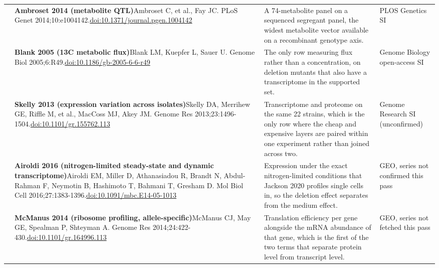 \begin{landscape}
\begin{longtable}{@{}r@{\hspace{4pt}} L{86mm} L{92mm} L{62mm}@{}}
 & \textbf{Ambroset 2014 (metabolite QTL)}\newline Ambroset C, et al., Fay JC. PLoS Genet 2014;10:e1004142.\newline \href{https://doi.org/10.1371/journal.pgen.1004142}{doi:10.1371/\allowbreak journal.pgen.1004142} & A 74-metabolite panel on a sequenced segregant panel, the widest metabolite vector available on a recombinant genotype axis. & PLOS Genetics SI \\
 & \textbf{Blank 2005 (13C metabolic flux)}\newline Blank LM, Kuepfer L, Sauer U. Genome Biol 2005;6:R49.\newline \href{https://doi.org/10.1186/gb-2005-6-6-r49}{doi:10.1186/\allowbreak gb-2005-6-6-r49} & The only row measuring flux rather than a concentration, on deletion mutants that also have a transcriptome in the supported set. & Genome Biology open-access SI \\
 & \textbf{Skelly 2013 (expression variation across isolates)}\newline Skelly DA, Merrihew GE, Riffle M, et al., MacCoss MJ, Akey JM. Genome Res 2013;23:1496-1504.\newline \href{https://doi.org/10.1101/gr.155762.113}{doi:10.1101/\allowbreak gr.155762.113} & Transcriptome and proteome on the same 22 strains, which is the only row where the cheap and expensive layers are paired within one experiment rather than joined across two. & Genome Research SI (unconfirmed) \\
 & \textbf{Airoldi 2016 (nitrogen-limited steady-state and dynamic transcriptome)}\newline Airoldi EM, Miller D, Athanasiadou R, Brandt N, Abdul-Rahman F, Neymotin B, Hashimoto T, Bahmani T, Gresham D. Mol Biol Cell 2016;27:1383-1396.\newline \href{https://doi.org/10.1091/mbc.E14-05-1013}{doi:10.1091/\allowbreak mbc.E14-05-1013} & Expression under the exact nitrogen-limited conditions that Jackson 2020 profiles single cells in, so the deletion effect separates from the medium effect. & GEO, series not confirmed this pass \\
 & \textbf{McManus 2014 (ribosome profiling, allele-specific)}\newline McManus CJ, May GE, Spealman P, Shteyman A. Genome Res 2014;24:422-430.\newline \href{https://doi.org/10.1101/gr.164996.113}{doi:10.1101/\allowbreak gr.164996.113} & Translation efficiency per gene alongside the mRNA abundance of that gene, which is the first of the two terms that separate protein level from transcript level. & GEO, series not fetched this pass \\

\end{longtable}
\end{landscape}
